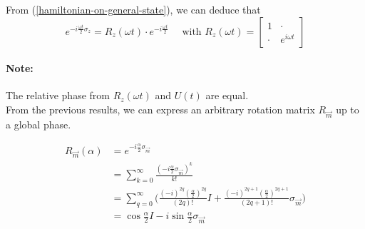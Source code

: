 \documentclass{article}
\begin{document}
From (\ref{hamiltonian-on-general-state}), we can deduce that
\begin{equation}
    e^{-i\frac{\omega t}{2}\sigma_z}=R_z(\omega t)\cdot e^{-i\frac{\omega t}{2}}
    \quad \text{ with } R_z(\omega t) = \begin{bmatrix}
        1 & \cdot \\ \cdot & e^{i\omega t}
    \end{bmatrix}
\end{equation}

\paragraph{Note: }
The relative phase from $R_z(\omega t)$ and $U(t)$ are equal.
\\\noindent
From the previous results, we can express an arbitrary rotation matrix $R_{\vec{m}}$ up to a global phase.

\begin{equation}
    \begin{aligned}
        R_{\vec{m}}(\alpha)
            & = e^{-i\frac{\alpha}{2}\sigma_{\vec{m}}} \\
            & = \sum_{k=0}^\infty
             \frac{(-i \frac{\alpha}{2}\sigma_{\vec{m}})^k}{k!} \\
            & = \sum_{q=0}^\infty \Big(\frac{(-i)^{2q}(\frac{\alpha}{2})^{2q}}{(2q)!}I +
                \frac{(-i)^{2q+1}(\frac{\alpha}{2})^{2q+1}}{(2q+1)!}\sigma_{\vec{m}}\Big) \\
            & = \cos\frac{\alpha}{2}I - i\sin\frac{\alpha}{2}\sigma_{\vec{m}}
    \end{aligned}
\end{equation}
\end{document}
